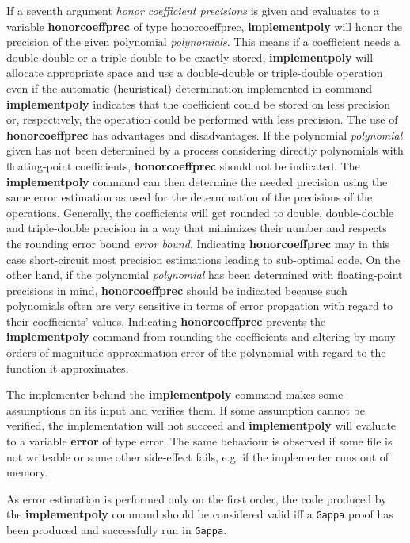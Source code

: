 \begin{itemize}
   If a seventh argument \emph{honor coefficient precisions} is given and
   evaluates to a variable \textbf{honorcoeffprec} of type \textsf{honorcoeffprec},
   \textbf{implementpoly} will honor the precision of the given polynomial
   \emph{polynomials}. This means if a coefficient needs a double-double or a
   triple-double to be exactly stored, \textbf{implementpoly} will allocate appropriate
   space and use a double-double or triple-double operation even if the
   automatic (heuristical) determination implemented in command \textbf{implementpoly}
   indicates that the coefficient could be stored on less precision or,
   respectively, the operation could be performed with less
   precision. The use of \textbf{honorcoeffprec} has advantages and
   disadvantages. If the polynomial \emph{polynomial} given has not been
   determined by a process considering directly polynomials with
   floating-point coefficients, \textbf{honorcoeffprec} should not be
   indicated. The \textbf{implementpoly} command can then determine the needed
   precision using the same error estimation as used for the
   determination of the precisions of the operations. Generally, the
   coefficients will get rounded to double, double-double and
   triple-double precision in a way that minimizes their number and
   respects the rounding error bound \emph{error bound}.  Indicating
   \textbf{honorcoeffprec} may in this case short-circuit most precision
   estimations leading to sub-optimal code. On the other hand, if the
   polynomial \emph{polynomial} has been determined with floating-point
   precisions in mind, \textbf{honorcoeffprec} should be indicated because such
   polynomials often are very sensitive in terms of error propgation with
   regard to their coefficients' values. Indicating \textbf{honorcoeffprec}
   prevents the \textbf{implementpoly} command from rounding the coefficients and
   altering by many orders of magnitude approximation error of the
   polynomial with regard to the function it approximates.
    
   The implementer behind the \textbf{implementpoly} command makes some assumptions on
   its input and verifies them. If some assumption cannot be verified,
   the implementation will not succeed and \textbf{implementpoly} will evaluate to a
   variable \textbf{error} of type \textsf{error}. The same behaviour is observed if
   some file is not writeable or some other side-effect fails, e.g. if
   the implementer runs out of memory.
    
   As error estimation is performed only on the first order, the code
   produced by the \textbf{implementpoly} command should be considered valid iff a
   \texttt{Gappa} proof has been produced and successfully run
   in \texttt{Gappa}.
\end{itemize}
